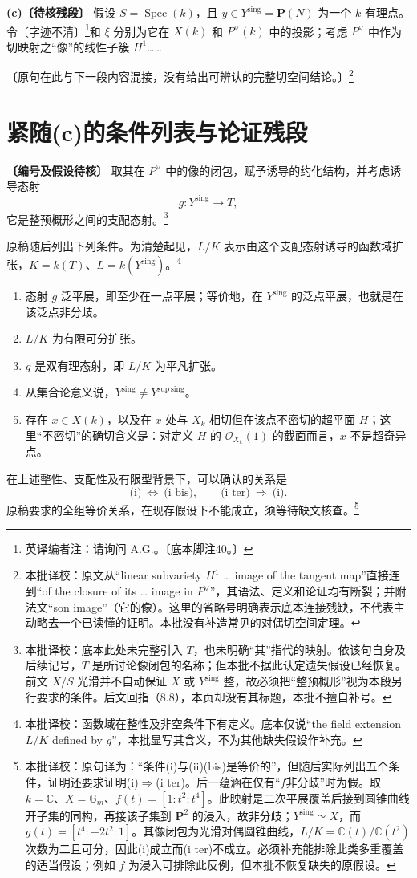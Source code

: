 \documentclass{ctexbook}
\newcommand{\corr}[1]{\footnote{本批译校：#1}}
\newcommand{\ednote}[1]{\footnote{英译编者注：#1}}
\newcommand{\Spec}{\operatorname{Spec}}
\newcommand{\Ys}{Y^{\mathrm{sing}}}
\newcommand{\Yss}{Y^{\mathrm{sup\,sing}}}
\begin{document}
\bigskip
\noindent\textbf{(c)〔待核残段〕} 假设 $S=\Spec(k)$，且 $y\in\Ys=\mathbf P(N)$ 为一个 $k$-有理点。令〔字迹不清〕\ednote{请询问 A.G.。〔底本脚注40。〕}和 $\xi$ 分别为它在 $X(k)$ 和 $P^\vee(k)$ 中的投影；考虑 $P^\vee$ 中作为切映射之“像”的线性子簇 $H^1$……

\noindent〔原句在此与下一段内容混接，没有给出可辨认的完整切空间结论。〕\corr{原文从“linear subvariety $H^1$ … image of the tangent map”直接连到“of the closure of its … image in $P^\vee$”，其语法、定义和论证均有断裂；并附法文“son image”（它的像）。这里的省略号明确表示底本连接残缺，不代表主动略去一个已读懂的证明。本批没有补造常见的对偶切空间定理。}

\chapter*{紧随(c)的条件列表与论证残段}
\noindent\textbf{〔编号及假设待核〕} 取其在 $P^\vee$ 中的像的闭包，赋予诱导的约化结构，并考虑诱导态射
\[
g:\Ys\longrightarrow T,
\]
它是整预概形之间的支配态射。\corr{底本此处未完整引入 $T$，也未明确“其”指代的映射。依该句自身及后续记号，$T$ 是所讨论像闭包的名称；但本批不据此认定遗失假设已经恢复。前文 $X/S$ 光滑并不自动保证 $X$ 或 $\Ys$ 整，故必须把“整预概形”视为本段另行要求的条件。后文回指（8.8），本页却没有其标题，本批不擅自补号。}

原稿随后列出下列条件。为清楚起见，$L/K$ 表示由这个支配态射诱导的函数域扩张，$K=k(T)$、$L=k(\Ys)$。\corr{函数域在整性及非空条件下有定义。底本仅说“the field extension $L/K$ defined by $g$”，本批显写其含义，不为其他缺失假设作补充。}
\begin{enumerate}
\item[(i)] 态射 $g$ 泛平展，即至少在一点平展；等价地，在 $\Ys$ 的泛点平展，也就是在该泛点非分歧。
\item[(i bis)] $L/K$ 为有限可分扩张。
\item[(i ter)] $g$ 是双有理态射，即 $L/K$ 为平凡扩张。
\item[(ii)] 从集合论意义说，$\Ys\ne\Yss$。
\item[(ii bis)] 存在 $x\in X(k)$，以及在 $x$ 处与 $X_k$ 相切但在该点不密切的超平面 $H$；这里“不密切”的确切含义是：对定义 $H$ 的 $\mathcal O_{X_k}(1)$ 的截面而言，$x$ 不是超奇异点。
\end{enumerate}

在上述整性、支配性及有限型背景下，可以确认的关系是
\[
\text{(i)}\ \Longleftrightarrow\ \text{(i bis)},
\qquad
\text{(i ter)}\ \Longrightarrow\ \text{(i)}.
\]
原稿要求的全组等价关系，在现存假设下不能成立，须等待缺文核查。\corr{原句译为：“条件(i)与(ii)(bis)是等价的”，但随后实际列出五个条件，证明还要求证明(i)$\Rightarrow$(i ter)。后一蕴涵在仅有“$f$非分歧”时为假。取 $k=\mathbb C$、$X=\mathbb G_m$、$f(t)=[1:t^2:t^4]$。此映射是二次平展覆盖后接到圆锥曲线开子集的同构，再接该子集到 $\mathbf P^2$ 的浸入，故非分歧；$\Ys\simeq X$，而 $g(t)=[t^4:-2t^2:1]$。其像闭包为光滑对偶圆锥曲线，$L/K=\mathbb C(t)/\mathbb C(t^2)$ 次数为二且可分，因此(i)成立而(i ter)不成立。必须补充能排除此类多重覆盖的适当假设；例如 $f$ 为浸入可排除此反例，但本批不恢复缺失的原假设。}
\end{document}
